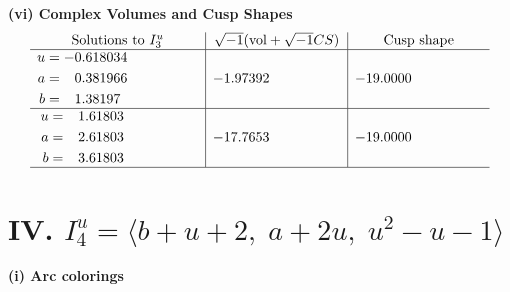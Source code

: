 \documentclass[1p]{elsarticle_modified}
\theoremstyle{definition}
\newcommand{\I}{\sqrt{-1}}
\begin{document}
\newpage\flushleft \textbf{(vi) Complex Volumes and Cusp Shapes}
$$\begin{array}{c|c|c}  
\text{Solutions to }I^u_{3}& \I (\text{vol} + \sqrt{-1}CS) & \text{Cusp shape}\\
 \hline 
\begin{aligned}
u &= -0.618034\phantom{ +0.000000I} \\
a &= \phantom{-}0.381966\phantom{ +0.000000I} \\
b &= \phantom{-}1.38197\phantom{ +0.000000I}\end{aligned}
 & -1.97392\phantom{ +0.000000I} & -19.0000\phantom{ +0.000000I} \\ \hline\begin{aligned}
u &= \phantom{-}1.61803\phantom{ +0.000000I} \\
a &= \phantom{-}2.61803\phantom{ +0.000000I} \\
b &= \phantom{-}3.61803\phantom{ +0.000000I}\end{aligned}
 & -17.7653\phantom{ +0.000000I} & -19.0000\phantom{ +0.000000I}\\
 \hline 
 \end{array}$$\newpage\newpage\renewcommand{\arraystretch}{1}
\centering \section*{IV. $I^u_{4}= \langle b+u+2,\;a+2 u,\;u^2- u-1 \rangle$}
\flushleft \textbf{(i) Arc colorings}\\
\end{document}
